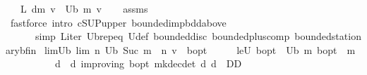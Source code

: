 \begin{isabellebody}
\ \ \ {\isachardoublequoteopen}{\isacharparenleft}{\kern0pt}L\ d{\isacharcircum}{\kern0pt}{\isacharcircum}{\kern0pt}m{\isacharparenright}{\kern0pt}\ v\ {\isasymle}\ U\isactrlsub b\ m\ v{\isachardoublequoteclose}\isanewline
%
\isadelimproof
\ \ %
\endisadelimproof
%
\isatagproof
{}\isamarkupfalse%
\ assms\isanewline
\ \ \isamarkupfalse%
\ {\isacharparenleft}{\kern0pt}fastforce\ intro{\isacharbang}{\kern0pt}{\isacharcolon}{\kern0pt}\ cSUP{\isacharunderscore}{\kern0pt}upper\ bounded{\isacharunderscore}{\kern0pt}imp{\isacharunderscore}{\kern0pt}bdd{\isacharunderscore}{\kern0pt}above\isanewline
\ \ \ \ \ \ simp{\isacharcolon}{\kern0pt}\ L{\isacharunderscore}{\kern0pt}iter\ U\isactrlsub b{\isachardot}{\kern0pt}rep{\isacharunderscore}{\kern0pt}eq\ U{\isacharunderscore}{\kern0pt}def\ bounded{\isacharunderscore}{\kern0pt}disc{\isacharunderscore}{\kern0pt}{\isasymP}\ bounded{\isacharunderscore}{\kern0pt}plus{\isacharunderscore}{\kern0pt}comp\ bounded{\isacharunderscore}{\kern0pt}stationary{\isacharunderscore}{\kern0pt}{\isasymnu}\isactrlsub b{\isacharunderscore}{\kern0pt}fin{\isacharparenright}{\kern0pt}%
\endisatagproof
{\isafoldproof}%
%
\isadelimproof
\isanewline
%
\endisadelimproof
\isanewline
\isanewline
{}\isamarkupfalse%
\ lim{\isacharunderscore}{\kern0pt}U\isactrlsub b{\isacharcolon}{\kern0pt}\ {\isachardoublequoteopen}lim\ {\isacharparenleft}{\kern0pt}{\isasymlambda}n{\isachardot}{\kern0pt}\ {\isacharparenleft}{\kern0pt}U\isactrlsub b\ {\isacharparenleft}{\kern0pt}Suc\ m{\isacharparenright}{\kern0pt}\ {\isacharcircum}{\kern0pt}{\isacharcircum}{\kern0pt}\ n{\isacharparenright}{\kern0pt}\ v{\isacharparenright}{\kern0pt}\ {\isacharequal}{\kern0pt}\ {\isasymnu}\isactrlsub b{\isacharunderscore}{\kern0pt}opt{\isachardoublequoteclose}\isanewline
%
\isadelimproof
%
\endisadelimproof
%
\isatagproof
{}\isamarkupfalse%
\ {\isacharminus}{\kern0pt}\isanewline
\ \ \isamarkupfalse%
\ le{\isacharunderscore}{\kern0pt}U{\isacharcolon}{\kern0pt}\ {\isachardoublequoteopen}{\isasymnu}\isactrlsub b{\isacharunderscore}{\kern0pt}opt\ {\isasymle}\ U\isactrlsub b\ m\ {\isasymnu}\isactrlsub b{\isacharunderscore}{\kern0pt}opt{\isachardoublequoteclose}\ \ m\isanewline
\ \ \isamarkupfalse%
\ {\isacharminus}{\kern0pt}\isanewline
\ \ \ \ \isamarkupfalse%
\ d\ \ d{\isacharcolon}{\kern0pt}\ {\isachardoublequoteopen}{\isasymnu}{\isacharunderscore}{\kern0pt}improving\ {\isasymnu}\isactrlsub b{\isacharunderscore}{\kern0pt}opt\ {\isacharparenleft}{\kern0pt}mk{\isacharunderscore}{\kern0pt}dec{\isacharunderscore}{\kern0pt}det\ d{\isacharparenright}{\kern0pt}{\isachardoublequoteclose}\ {\isachardoublequoteopen}d\ {\isasymin}\ D\isactrlsub D{\isachardoublequoteclose}\isanewline

\end{isabellebody}
